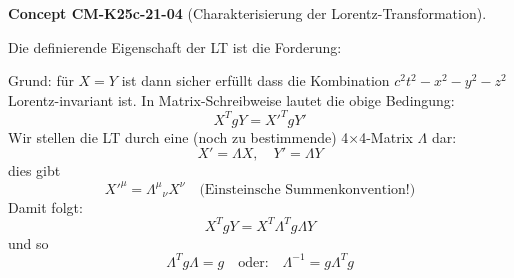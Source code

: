 \documentclass[10pt, letterpaper]{article}
\newcommand{\CustomHeading}[3]{%
  \par\medskip\noindent%
  \textbf{#1 #2} \textnormal{(#3)}.\enskip%
}
\newenvironment{CONC}[2]{\CustomHeading{Concept}{#1}{#2}}{}
\begin{document}
\begin{CONC}{CM-K25c-21-04}{Charakterisierung der Lorentz-Transformation}
Die definierende Eigenschaft der LT ist die Forderung:


Grund: für $X = Y$ ist dann sicher erfüllt dass die Kombination $c^2t^2-x^2-y^2-z^2$ Lorentz-invariant ist. In Matrix-Schreibweise lautet die obige Bedingung:
\[ X^T g Y = X'^T g Y' \]
Wir stellen die LT durch eine (noch zu bestimmende) 4×4-Matrix $\Lambda$ dar:
\[ X' = \Lambda X, \quad Y' = \Lambda Y \]
dies gibt
\[  X'^\mu = \Lambda^\mu{}_\nu X^\nu \quad \text{(Einsteinsche Summenkonvention!)} \]
Damit folgt:
\[ X^T g Y = X^T \Lambda^T g \Lambda Y \]
und so 
\[\Lambda^T g \Lambda = g \quad \text{oder:} \quad \Lambda^{-1} = g \Lambda^T g \]
\end{CONC}
\end{document}
